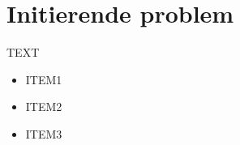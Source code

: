 

\section{Initierende problem}
\label{sec:initierende-problem}
TEXT
\begin{itemize}
\item ITEM1

\item ITEM2

\item ITEM3
\end{itemize}

